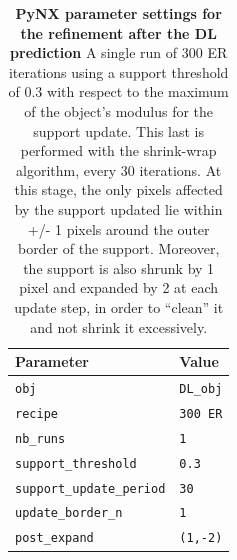 \begin{table}[H] 

    \centering
    {%
      \begin{tabular}{|l|l|}
        \hline
        \textbf{Parameter} & \textbf{Value} \\
        \hline 
        \texttt{obj}                                     & \texttt{DL\_obj} \\
        \texttt{recipe}                                  & \texttt{300 ER} \\
        \texttt{nb\_runs}                                & \texttt{1} \\
        \texttt{support\_threshold}                      & \texttt{0.3} \\
        \texttt{support\_update\_period}                 & \texttt{30} \\
        \texttt{update\_border\_n}                       & \texttt{1} \\
        \texttt{post\_expand}                            & \texttt{(1,-2)} \\
        \hline
      \end{tabular}%
    } 
    \caption{\textbf{PyNX parameter settings for the refinement after the DL prediction} A single run of 300 ER iterations 
    using a support threshold of 0.3 with respect to the maximum of the object's modulus for the support update. This 
    last is performed with the shrink-wrap algorithm, every 30 iterations. At this stage, the only pixels affected 
    by the support updated lie within +/- 1 pixels around the outer border of the support. Moreover, the support is 
    also shrunk by 1 pixel and expanded by 2 at each update step, in order to ``clean'' it and not shrink it 
    excessively. }
    \label{table:DLpynx}
  \end{table}

